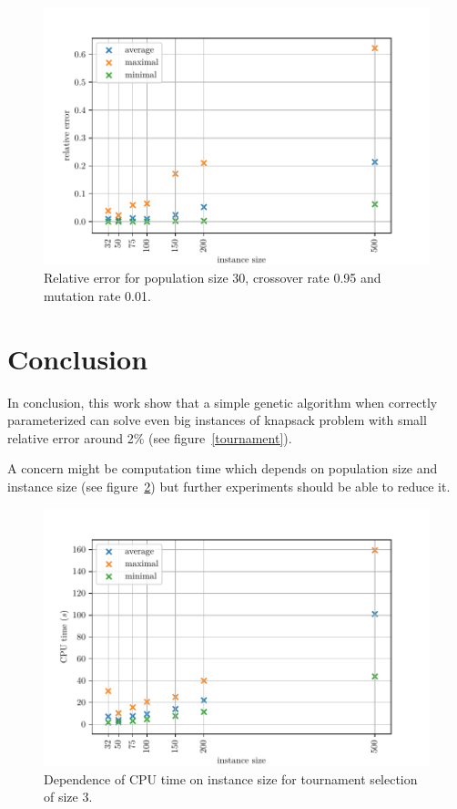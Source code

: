 \documentclass{article}
\begin{document}
\begin{figure}[ht]
\vskip 0.2in
\begin{center}
\centerline{\includegraphics[width=\columnwidth]{figs/params}}
\caption{Relative error for population size 30, crossover rate 0.95
and mutation rate 0.01.}
\label{params}
\end{center}
\vskip -0.2in
\end{figure}

\section{Conclusion}

In conclusion, this work show that a simple genetic algorithm
when correctly parameterized can solve even big instances of knapsack problem
with small relative error around 2\% (see figure~\ref{tournament}).

A concern might be computation time which depends on population size
and instance size (see figure~\ref{time})
but further experiments should be able to reduce it.

\begin{figure}[ht]
\vskip 0.2in
\begin{center}
\centerline{\includegraphics[width=\columnwidth]{figs/time}}
\caption{Dependence of CPU time on instance size for tournament selection
of size 3.}
\label{time}
\end{center}
\vskip -0.2in
\end{figure}




\end{document}
